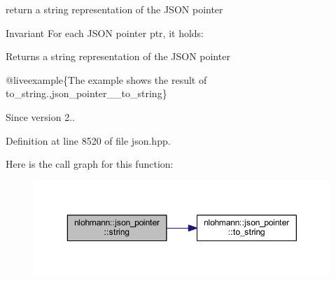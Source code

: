 return a string representation of the J\+S\+ON pointer 

\begin{DoxyInvariant}{Invariant}
For each J\+S\+ON pointer {\ttfamily ptr}, it holds\+: 
\begin{DoxyCode}{0}
\end{DoxyCode}

\end{DoxyInvariant}
\begin{DoxyReturn}{Returns}
a string representation of the J\+S\+ON pointer
\end{DoxyReturn}
@liveexample\{The example shows the result of {\ttfamily to\+\_\+string}.,json\+\_\+pointer\+\_\+\+\_\+to\+\_\+string\}

\begin{DoxySince}{Since}
version 2.. 
\end{DoxySince}


Definition at line 8520 of file json.\+hpp.

Here is the call graph for this function\+:
\nopagebreak
\begin{figure}[H]
\begin{center}
\leavevmode
\includegraphics[width=350pt]{classnlohmann_1_1json__pointer_ae9015c658f99cf3d48a8563accc79988_cgraph}
\end{center}
\end{figure}
\mbox{\label{classnlohmann_1_1json__pointer_a7395bd0af29ac23fd3f21543c935cdfa}} 

